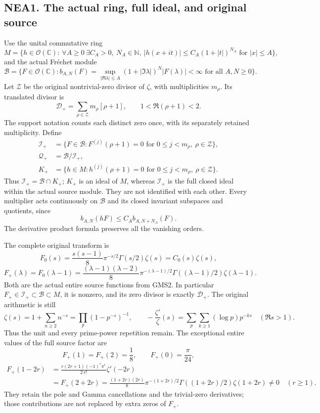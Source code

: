 \subsection{NEA1. The actual ring, full ideal, and original
source}\label{nea1.-the-actual-ring-full-ideal-and-original-source}

Use the unital commutative ring \[
M=\{h\in\mathcal O(\mathbb C):\ 
\forall A\ge0\ \exists C_A>0,\ N_A\in\mathbb N,
\ |h(x+it)|\le C_A(1+|t|)^{N_A}\text{ for }|x|\le A\},
\tag{NEA1.1}
\] and the actual Fréchet module \[
\mathcal B=\{F\in\mathcal O(\mathbb C):
b_{A,N}(F)=\sup_{|\Re\lambda|\le A}(1+|\Im\lambda|)^N|F(\lambda)|<\infty
\text{ for all }A,N\ge0\}.
\tag{NEA1.2}
\] Let \(\mathscr Z\) be the original nontrivial-zero divisor of
\(\zeta\), with multiplicities \(m_\rho\). Its translated divisor is \[
\mathscr D_+=\sum_{\rho\in\mathscr Z}m_\rho[\rho+1],\qquad
1<\Re(\rho+1)<2.
\tag{NEA1.3}
\] The support notation counts each distinct zero once, with its
separately retained multiplicity. Define \[
\begin{aligned}
\mathcal I_+&=\{F\in\mathcal B:F^{(j)}(\rho+1)=0
\text{ for }0\le j<m_\rho,\ \rho\in\mathscr Z\},\\
\mathcal Q_+&=\mathcal B/\mathcal I_+,\\
K_+&=\{h\in M:h^{(j)}(\rho+1)=0
\text{ for }0\le j<m_\rho,\ \rho\in\mathscr Z\}.
\end{aligned}
\tag{NEA1.4}
\] Thus \(\mathcal I_+=\mathcal B\cap K_+\); \(K_+\) is an ideal of
\(M\), whereas \(\mathcal I_+\) is the full closed ideal within the
actual source module. They are not identified with each other. Every
multiplier acts continuously on \(\mathcal B\) and its closed invariant
subspaces and quotients, since \[
b_{A,N}(hF)\le C_A b_{A,N+N_A}(F).
\tag{NEA1.5}
\] The derivative product formula preserves all the vanishing orders.

The complete original transform is \[
F_0(s)=\frac{s(s-1)}8\pi^{-s/2}\Gamma(s/2)\zeta(s)
=C_0(s)\zeta(s),
\] \[
F_+(\lambda)=F_0(\lambda-1)
=\frac{(\lambda-1)(\lambda-2)}8
\pi^{-(\lambda-1)/2}\Gamma((\lambda-1)/2)\zeta(\lambda-1).
\tag{NEA1.6}
\] Both are the actual entire source functions from GMS2. In particular
\(F_+\in\mathcal I_+\subset\mathcal B\subset M\), it is nonzero, and its
zero divisor is exactly \(\mathscr D_+\). The original arithmetic is
still \[
\zeta(s)=1+\sum_{n\ge2}n^{-s}=\prod_p(1-p^{-s})^{-1},\qquad
-\frac{\zeta'}{\zeta}(s)=\sum_p\sum_{k\ge1}(\log p)p^{-ks}
\quad(\Re s>1).
\tag{NEA1.7}
\] Thus the unit and every prime-power repetition remain. The
exceptional entire values of the full source factor are \[
F_+(1)=F_+(2)=\frac18,\qquad F_+(0)=\frac\pi{24},
\] \[
\begin{aligned}
F_+(1-2r)
&=\frac{r(2r+1)(-1)^r\pi^r}{2\,r!}\zeta'(-2r)\\
&=F_+(2+2r)
=\frac{(1+2r)(2r)}8\pi^{-(1+2r)/2}
\Gamma((1+2r)/2)\zeta(1+2r)\ne0\quad(r\ge1).
\end{aligned}
\tag{NEA1.8}
\] They retain the pole and Gamma cancellations and the trivial-zero
derivatives; those contributions are not replaced by extra zeros of
\(F_+\).

